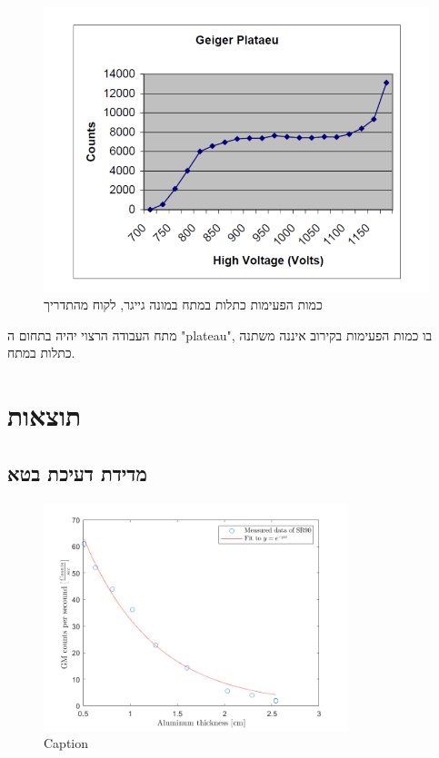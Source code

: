 \documentclass{article}
\begin{document}
\begin{figure}[ht!]
    \centering
    \includegraphics{plateau.png}
    \caption{כמות הפעימות כתלות במתח במונה גייגר, לקוח מהתדריך}
    \label{fig:plateau}
\end{figure}

מתח העבודה הרצוי יהיה בתחום ה
\textenglish{"plateau"},
בו כמות הפעימות בקירוב איננה משתנה כתלות במתח.

\section{
תוצאות
}

\subsection{
מדידת דעיכת בטא
}


\begin{figure}[ht!]
    \centering
    \includegraphics[width=0.79\textwidth]{SR90.png}
    \caption{Caption}
    \label{fig:decay_SR90}
\end{figure}
\end{document}
